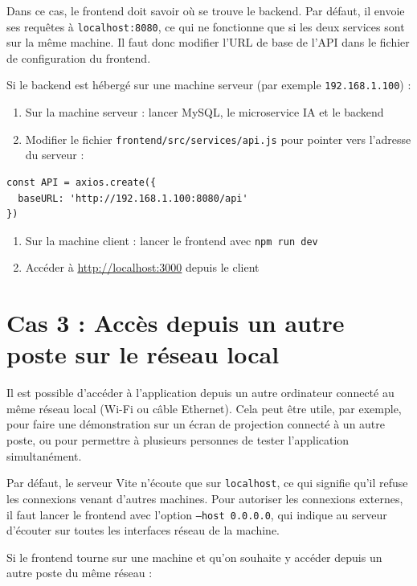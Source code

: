 \documentclass[12pt,a4paper]{report}
\begin{document}
Dans ce cas, le frontend doit savoir où se trouve le backend. Par défaut, il envoie ses requêtes à \texttt{localhost:8080}, ce qui ne fonctionne que si les deux services sont sur la même machine. Il faut donc modifier l'URL de base de l'API dans le fichier de configuration du frontend.

Si le backend est hébergé sur une machine serveur (par exemple \texttt{192.168.1.100}) :

\begin{enumerate}
    \item Sur la machine serveur : lancer MySQL, le microservice IA et le backend
    \item Modifier le fichier \texttt{frontend/src/services/api.js} pour pointer vers l'adresse du serveur :
\end{enumerate}

\begin{verbatim}
const API = axios.create({
  baseURL: 'http://192.168.1.100:8080/api'
})
\end{verbatim}

\begin{enumerate}[resume]
    \item Sur la machine client : lancer le frontend avec \texttt{npm run dev}
    \item Accéder à \url{http://localhost:3000} depuis le client
\end{enumerate}

\section{Cas 3 : Accès depuis un autre poste sur le réseau local}

Il est possible d'accéder à l'application depuis un autre ordinateur connecté au même réseau local (Wi-Fi ou câble Ethernet). Cela peut être utile, par exemple, pour faire une démonstration sur un écran de projection connecté à un autre poste, ou pour permettre à plusieurs personnes de tester l'application simultanément.

Par défaut, le serveur Vite n'écoute que sur \texttt{localhost}, ce qui signifie qu'il refuse les connexions venant d'autres machines. Pour autoriser les connexions externes, il faut lancer le frontend avec l'option \texttt{--host 0.0.0.0}, qui indique au serveur d'écouter sur toutes les interfaces réseau de la machine.

Si le frontend tourne sur une machine et qu'on souhaite y accéder depuis un autre poste du même réseau :
\end{document}

